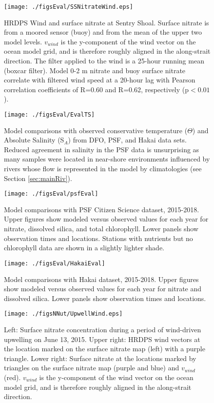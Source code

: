 \documentclass[draft,jgrga]{agutexSI2019}
\begin{document}
\begin{article}
\begin{figure}[!ht]
      \centering
      \texttt{[image: ./figsEval/SSNitrateWind.eps]}
      \caption{HRDPS Wind and surface nitrate at Sentry Shoal. Surface nitrate is from a moored sensor (buoy) and from the mean of the upper two model levels. $v_{wind}$ is the y-component of the wind vector on the ocean model grid, and is therefore roughly aligned in the along-strait direction. The filter applied to the wind is a 25-hour running mean (boxcar filter). Model 0-2 m nitrate and buoy surface nitrate correlate with filtered wind speed at a 20-hour lag with Pearson correlation coefficients of R=0.60 and R=0.62, respectively ($\textrm{p}<0.01$).}
       \label{fig:SSWindNCorr}
\end{figure}

\begin{figure}[h]
  \centering
  \texttt{[image: ./figsEval/EvalTS]}
  \caption{Model comparisons with observed conservative temperature ($\Theta$) and Absolute Salinity (S$_A$) from DFO, PSF, and Hakai data sets. Reduced agreement in salinity in the PSF data is unsurprising as many samples were located in near-shore environments influenced by rivers whose flow is represented in the model by climatologies (see Section \ref{sec:mainRiv}).}
  \label{fig:evalTS}
\end{figure}

\begin{figure}[!ht]
  \centering
  \texttt{[image: ./figsEval/psfEval]}
  \caption{Model comparisons with PSF Citizen Science dataset, 2015-2018. Upper figures show modeled versus observed values for each year for nitrate, dissolved silica, and total chlorophyll. Lower panels show observation times and locations. Stations with nutrients but no chlorophyll data are shown in a slightly lighter shade. }
  \label{fig:evalPSF}
\end{figure}

\begin{figure}[!ht]
  \centering
  \texttt{[image: ./figsEval/HakaiEval]}
  \caption{Model comparisons with Hakai dataset, 2015-2018. Upper figures show modeled versus observed values for each year for nitrate and dissolved silica. Lower panels show observation times and locations. }
  \label{fig:evalHakai}
\end{figure}

\begin{figure}[!ht]
  \centering
  \texttt{[image: ./figsNNut/UpwellWind.eps]}
  \caption{Left: Surface nitrate concentration during a period of wind-driven upwelling on June 13, 2015. Upper right: HRDPS wind vectors at the location marked on the surface nitrate map (left) with a purple triangle. Lower right: Surface nitrate at the locations marked by triangles on the surface nitrate map (purple and blue) and $v_{wind}$ (red).  $v_{wind}$ is the y-component of the wind vector on the ocean model grid, and is therefore roughly aligned in the along-strait direction. }
  \label{fig:UpwellWind}
\end{figure}


\end{article}
\end{document}
